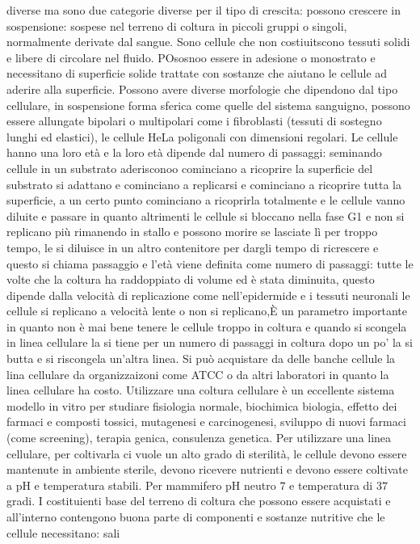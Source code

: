 diverse ma sono due categorie diverse per il tipo di crescita: possono crescere in sospensione: sospese nel terreno di coltura in piccoli gruppi o singoli, normalmente derivate dal 
sangue. Sono cellule che non costiuitscono tessuti solidi e libere di circolare nel fluido. POsosnoo essere in adesione o monostrato e necessitano di superficie solide trattate con
sostanze che aiutano le cellule ad aderire alla superficie. Possono avere diverse morfologie che dipendono dal tipo cellulare, in sospensione forma sferica come quelle del sistema 
sanguigno, possono essere allungate bipolari o multipolari come i fibroblasti (tessuti di sostegno lunghi ed elastici), le cellule HeLa poligonali con dimensioni regolari. Le cellule
hanno una loro et\`a e la loro et\`a dipende dal numero di passaggi: seminando cellule in un substrato aderisconoo cominciano a ricoprire la superficie del substrato si adattano e 
cominciano a replicarsi e cominciano a ricoprire tutta la superficie, a un certo punto cominciano a ricoprirla totalmente e le cellule vanno diluite e passare in quanto altrimenti le 
cellule si bloccano nella fase G1 e non si replicano pi\`u rimanendo in stallo e possono morire se lasciate l\`i per troppo tempo, le si diluisce in un altro contenitore per dargli tempo
di ricrescere e questo si chiama passaggio e l'et\`a viene definita come numero di passaggi: tutte le volte che la coltura ha raddoppiato di volume ed \`e stata diminuita, questo dipende
dalla velocit\`a di replicazione come nell'epidermide e i tessuti neuronali le cellule si replicano a velocit\`a lente o non si replicano,\`E un parametro importante in quanto non \`e
mai bene tenere le cellule troppo in coltura e quando si scongela in linea cellulare la si tiene per un numero di passaggi in coltura dopo un po' la si butta e si riscongela un'altra
linea. Si pu\`o acquistare da delle banche cellule la lina cellulare da organizzaizoni come ATCC o da altri laboratori in quanto la linea cellulare ha costo. Utilizzare una coltura
cellulare \`e un eccellente sistema modello in vitro per studiare fisiologia normale, biochimica biologia, effetto dei farmaci e composti tossici, mutagenesi e carcinogenesi, 
sviluppo di nuovi farmaci (come screening), terapia genica, consulenza genetica. Per utilizzare una linea cellulare, per coltivarla ci vuole un alto grado di sterilit\`a, le cellule
devono essere mantenute in ambiente sterile, devono ricevere nutrienti e devono essere coltivate a pH e temperatura stabili. Per mammifero pH neutro $7$ e temperatura di $37$ gradi. 
I costituienti base del terreno di coltura che possono essere acquistati e all'interno contengono buona parte di componenti e sostanze nutritive che le cellule necessitano: sali 
